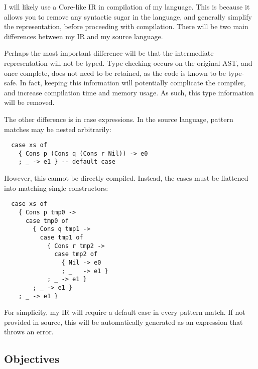 \documentclass[9pt]{extarticle}
\begin{document}
I will likely use a Core-like IR in compilation of my language. This is
because it allows you to remove any syntactic sugar in the language, and
generally simplify the representation, before proceeding with
compilation. There will be two main differences between my IR and my
source language.

Perhaps the most important difference will be that the intermediate
representation will not be typed. Type checking occurs on the original
AST, and once complete, does not need to be retained, as the code is
known to be type-safe. In fact, keeping this information will
potentially complicate the compiler, and increase compilation time and
memory usage. As such, this type information will be removed.

The other difference is in case expressions. In the source language,
pattern matches may be nested arbitrarily:

\begin{verbatim}
  case xs of
    { Cons p (Cons q (Cons r Nil)) -> e0
    ; _ -> e1 } -- default case
\end{verbatim}

However, this cannot be directly compiled. Instead, the cases must be
flattened into matching single constructors:

\begin{verbatim}
  case xs of
    { Cons p tmp0 ->
      case tmp0 of
        { Cons q tmp1 ->
          case tmp1 of
            { Cons r tmp2 ->
              case tmp2 of
                { Nil -> e0
                ; _   -> e1 }
            ; _ -> e1 }
        ; _ -> e1 }
    ; _ -> e1 }
\end{verbatim}

For simplicity, my IR will require a default case in every pattern
match. If not provided in source, this will be automatically generated
as an expression that throws an error.

\subsection{Objectives}
\end{document}
